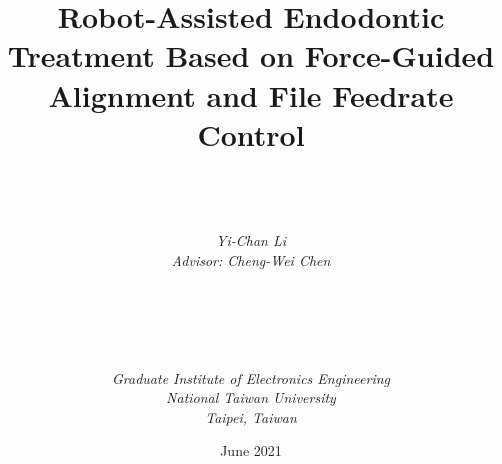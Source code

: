 \documentclass[a4paper, 12pt, twoside, openright]{mythesis}
\begin{document}
\title{\textbf{Robot-Assisted Endodontic Treatment Based on Force-Guided Alignment and File Feedrate Control}}

\author{ \\  \\ \\
{\it Yi-Chan Li}\\
{\it Advisor: Cheng-Wei Chen} \\ \\ \\ \\  \\ \\
{\it Graduate Institute of Electronics Engineering}\\
{\it National Taiwan University} \\
{\it Taipei, Taiwan}\\ }

{\date{June 2021}}

\maketitle

\frontmatter

\tableofcontents
\listoffigures
\listoftables


\mainmatter












\end{document}
